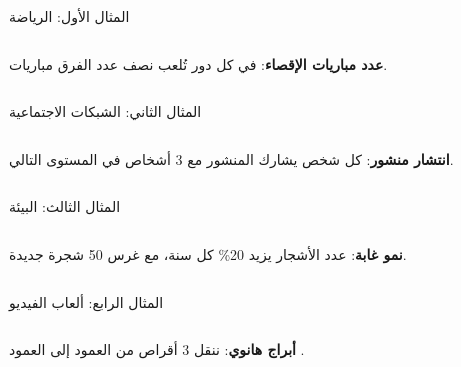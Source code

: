 \documentclass[aspectratio=169, 11pt, t, xcolor={table}]{beamer}
\begin{document}
\begin{frame}[t]{المثال الأول: الرياضة}
    \begin{columns}[T]
        {\small \textbf{عدد مباريات الإقصاء}: في كل دور تُلعب نصف عدد الفرق مباريات.\par}
        \vspace{0.3cm}
    \end{columns}
\end{frame}

\begin{frame}[t]{المثال الثاني: الشبكات الاجتماعية}
    \begin{columns}[T]
        {\small \textbf{انتشار منشور}: كل شخص يشارك المنشور مع 3 أشخاص في المستوى التالي.\par}
        \vspace{0.3cm}
    \end{columns}
\end{frame}

\begin{frame}[t]{المثال الثالث: البيئة}
    \begin{columns}[T]
        {\small \textbf{نمو غابة}: عدد الأشجار يزيد 20\% كل سنة، مع غرس 50 شجرة جديدة.\par}
        \vspace{0.3cm}
    \end{columns}
\end{frame}

\begin{frame}[t]{المثال الرابع: ألعاب الفيديو}
    \begin{columns}[T]
        {\small \textbf{أبراج هانوي}: ننقل 3 أقراص من العمود  إلى العمود .\par}
        \vspace{0.3cm}
    \end{columns}
\end{frame}
\end{document}
